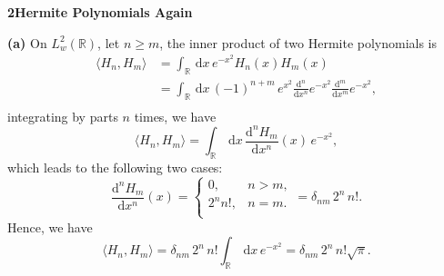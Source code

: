 \documentclass[12pt]{article}
\newcommand{\problem}[2]{%
    \par\vspace{1em}
    \noindent\textbf{#1\quad #2}
    \par\smallskip
}
\begin{document}
\pagebreak
\problem{2}{Hermite Polynomials Again}
\noindent\textbf{(a)}\quad
On $L^2_{w}(\mathbb{R})$, let $n \geq m$, the inner product of two Hermite polynomials is
\begin{equation}
\begin{aligned}
    \langle H_n,H_m  \rangle &= \int_{\mathbb{R}}\, \mathrm{d}x\, e^{-x^2} H_n(x) H_m(x)\\
    & = \int_{\mathbb{R}}\, \mathrm{d}x\, (-1)^{n+m}\, e^{x^2} \frac{\mathrm{d}^n}{\mathrm{d}x^n} e^{-x^2} \frac{\mathrm{d}^m}{\mathrm{d}x^m} e^{-x^2},\\
\end{aligned}
\end{equation}
integrating by parts $n$ times, we have
\begin{equation}
    \langle H_n,H_m  \rangle = \int_{\mathbb{R}} \, \mathrm{d}x\, \frac{\mathrm{d}^nH_m}{\mathrm{d}x^n}(x)\, e^{-x^2},
\end{equation}
which leads to the following two cases:
\[
\frac{\mathrm{d}^nH_m}{\mathrm{d}x^n}(x) =
\begin{cases}
    0, & n > m,\\
    2^n n!, & n = m.\\
\end{cases}
= \delta_{nm}\, 2^n\, n!.
\]
Hence, we have
\begin{equation}
    \langle H_n,H_m  \rangle = \delta_{nm}\, 2^n\, n! \int_{\mathbb{R}} \, \mathrm{d}x\, e^{-x^2} = \delta_{nm}\, 2^n\, n! \sqrt{\pi}.
\end{equation}
\end{document}
